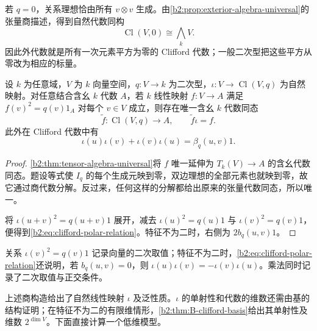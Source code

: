 若 \(q=0\)，关系理想恰由所有 \(v\otimes v\) 生成。由\cref{b2:prop:exterior-algebra-universal}的张量商描述，得到自然代数同构
\[
	\operatorname{Cl}(V,0)\cong\bigwedge_k V.
\]
因此外代数就是所有一次元素平方为零的 Clifford 代数；一般二次型把这些平方从零改为相应的标量。

\begin{theorem}\label{b2:thm:clifford-universal}
	设 \(k\) 为任意域，\(V\) 为 \(k\) 向量空间，\(q:V\to k\) 为二次型，\(\iota:V\to\operatorname{Cl}(V,q)\) 为自然映射。对任意结合含幺 \(k\) 代数 \(A\)，若 \(k\) 线性映射 \(f:V\to A\) 满足 \(f(v)^2=q(v)1_A\) 对每个 \(v\in V\) 成立，则存在唯一含幺 \(k\) 代数同态
	\[
		\widetilde f:\operatorname{Cl}(V,q)\longrightarrow A, \qquad \widetilde f\iota=f.
	\]
	此外在 Clifford 代数中有
	\begin{equation}\label{b2:eq:clifford-polar-relation}
		\iota(u)\iota(v)+\iota(v)\iota(u)=\beta_q(u,v)1.
	\end{equation}
\end{theorem}
\begin{proof}
	\cref{b2:thm:tensor-algebra-universal}将 \(f\) 唯一延伸为 \(T_k(V)\to A\) 的含幺代数同态。题设等式使 \(I_q\) 的每个生成元映到零，双边理想的全部元素也就映到零，故它通过商代数分解。反过来，任何这样的分解都给出原来的张量代数同态，所以唯一。

	将 \(\iota(u+v)^2=q(u+v)1\) 展开，减去 \(\iota(u)^2=q(u)1\) 与 \(\iota(v)^2=q(v)1\)，便得到\eqref{b2:eq:clifford-polar-relation}。特征不为二时，右侧为 \(2b_q(u,v)1\)。
\end{proof}

关系 \(\iota(v)^2=q(v)1\) 记录向量的二次取值；特征不为二时，\eqref{b2:eq:clifford-polar-relation}还说明，若 \(b_q(u,v)=0\)，则 \(\iota(u)\iota(v)=-\iota(v)\iota(u)\)。乘法同时记录了二次取值与正交条件。

\ProseParagraphBreak
上述商构造给出了自然线性映射 \(\iota\) 及泛性质。\(\iota\) 的单射性和代数的维数还需由基的结构证明；在特征不为二的有限维情形，\cref{b2:thm:B-clifford-basis}给出其单射性及维数 \(2^{\dim V}\)。下面直接计算一个低维模型。

